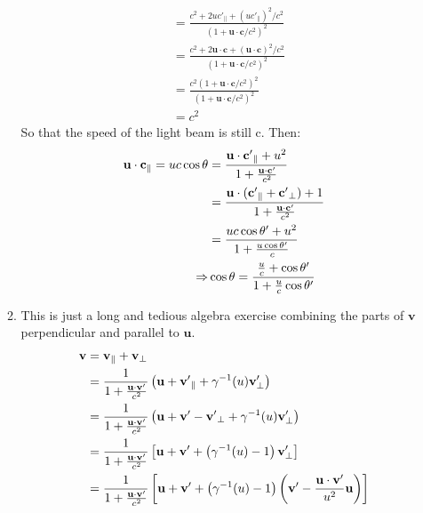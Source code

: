 \documentclass[12pt,a4]{article}
\begin{document}
\begin{enumerate}
\begin{enumerate}
\begin{align*}
                                                       &= \frac{c^2 + 2 u {c'}_\parallel + (u{c'}_\parallel)^2/ c^2}{(1 + \mathbf{u} \cdot \mathbf{c}/c^2)^2}\\
                                                       &= \frac{c^2 + 2\mathbf{u} \cdot \mathbf{c}  + (\mathbf{u} \cdot \mathbf{c})^2/ c^2}{(1 + \mathbf{u} \cdot \mathbf{c}/c^2)^2}\\
                                                       &= \frac{c^2 (1 + \mathbf{u} \cdot \mathbf{c}/c^2)^2}{(1 + \mathbf{u} \cdot \mathbf{c}/c^2)^2}\\
                                                       &= c^2
        \end{align*}
        So that the speed of the light beam is still c.
        Then:
        \begin{align*}
          {\bf u} \cdot {\bf c}_\parallel  = u c \cos \theta & = \frac{{\bf u} \cdot {\bf c'}_\parallel + u^2}{1 + \frac{{\bf u} \cdot {\bf c'}}{c^2}}\\
                                                             & = \frac{{\bf u} \cdot ({\bf c'}_\parallel + {\bf c'}_\perp) + 1}{1 + \frac{{\bf u} \cdot {\bf c'}}{c^2}}\\
                                                  & = \frac{uc \cos \theta ' + u^2}{1 + \frac{u \cos \theta '}{c}}\\
                                      \Rightarrow &\cos\theta = \frac{\frac{u}{c} + \cos \theta '}{1 + \frac{u}{c} \cos\theta ' }
        \end{align*}
      \item
        This is just a long and tedious algebra exercise combining the parts of $\mathbf{v}$ perpendicular and parallel to $\mathbf{u}$.
        \begin{align*}
          {\bf v} &= {\bf v}_\parallel + {\bf v}_\perp\\
                  &= \frac{1}{1 + \frac{{\bf u} \cdot {\bf v}'}{c^2}} \left( {\bf u} + {\bf v'}_\parallel + \gamma^{-1}(  u) {\bf v}'_\perp\right)\\
                  &= \frac{1}{1 + \frac{{\bf u} \cdot {\bf v}'}{c^2}} \left( {\bf u} + {\bf v'} - {\bf v'}_\perp + \gamma^{-1}(  u) {\bf v}'_\perp\right)\\
                  &= \frac{1}{1 + \frac{{\bf u} \cdot {\bf v}'}{c^2}} \left[ {\bf u} + {\bf v'} + \left(\gamma^{-1}(  u) - 1\right) {\bf v}'_\perp\right]\\
                  &= \frac{1}{1 + \frac{{\bf u} \cdot {\bf v}'}{c^2}} \left[ {\bf u} + {\bf v'} + \left(\gamma^{-1}(  u) - 1\right) \left({\bf v}' - \frac{{\bf u}\cdot{\bf v}'}{u^2} {\bf u}\right)\right]\\

\end{align*}
\end{enumerate}
\end{enumerate}
\end{document}
